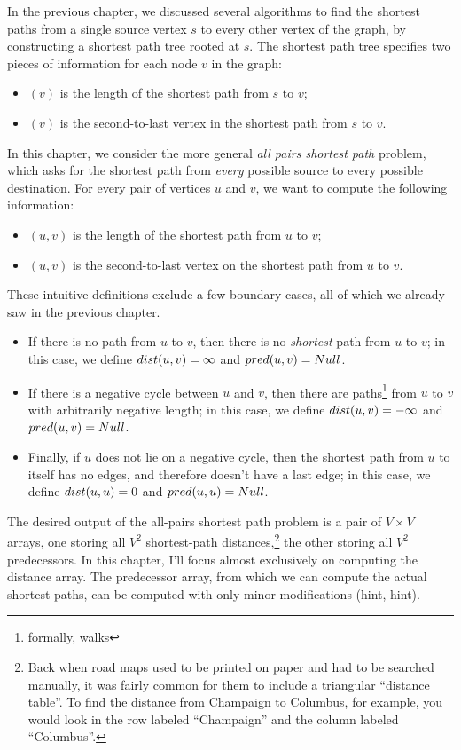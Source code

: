 In the previous chapter, we discussed several algorithms to find the shortest paths from a single source vertex $s$ to every other vertex of the graph, by constructing a shortest path tree rooted at $s$.
The shortest path tree specifies two pieces of information for each node $v$ in the graph:
\begin{itemize}
\item {}$(v)$ is the length of the shortest path from $s$ to $v$;
\item {}$(v)$ is the second-to-last vertex in the shortest path from $s$ to $v$.
\end{itemize}
In this chapter, we consider the more general \textit{all pairs shortest path} problem, which asks for the shortest path from \textit{every} possible source to every possible destination.
For every pair of vertices $u$ and $v$, we want to compute the following information:
\begin{itemize}
\item {}$(u, v)$ is the length of the shortest path from $u$ to $v$;
\item {}$(u, v)$ is the second-to-last vertex on the shortest path from $u$ to $v$.
\end{itemize}
These intuitive definitions exclude a few boundary cases, all of which we already saw in the previous chapter.
\begin{itemize}
\item If there is no path from $u$ to $v$, then there is no \textit{shortest} path from $u$ to $v$; in this case, we define $dist(u, v) = \infty$ and $pred(u, v) = Null$.
\item If there is a negative cycle between $u$ and $v$, then there are paths\footnote{formally, walks} from $u$ to $v$ with arbitrarily negative length; in this case, we define $dist(u, v) = -\infty$ and $pred(u, v) = Null$.
\item Finally, if $u$ does not lie on a negative cycle, then the shortest path from $u$ to itself has no edges, and therefore doesn’t have a last edge; in this case, we define $dist(u, u) = 0$ and $pred(u, u) = Null$.
\end{itemize}
The desired output of the all-pairs shortest path problem is a pair of $V \times V$ arrays, one storing all $V^2$ shortest-path distances,\footnote{Back when road maps used to be printed on paper and had to be searched manually, it was fairly common for them to include a triangular “distance table”. To find the distance from Champaign to Columbus, for example, you would look in the row labeled “Champaign” and the column labeled “Columbus”.} the other storing all $V^2$ predecessors.
In this chapter, I’ll focus almost exclusively on computing the distance array.
The predecessor array, from which we can compute the actual shortest paths, can be computed with only minor modifications (hint, hint).

